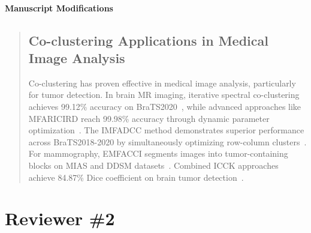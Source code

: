 \documentclass{ar2rc}
\theoremstyle{definition}
\theoremstyle{remark} %
\renewcommand{\cite}[1]{~\autocite{#1}}
\begin{document}

\paragraph{Manuscript Modifications}

\begin{quote}
  \subsection*{ Co-clustering Applications in Medical Image Analysis}
  Co-clustering has proven effective in medical image analysis, particularly for tumor detection. In brain MR imaging, iterative spectral co-clustering achieves 99.12\% accuracy on BraTS2020\cite{farnoosh2024DevelopmentUnsupervisedPseudodeep}, while advanced approaches like MFARICIRD reach 99.98\% accuracy through dynamic parameter optimization\cite{farnoosh2025PseudodeepUnsupervisedModelbased}. The IMFADCC method demonstrates superior performance across BraTS2018-2020 by simultaneously optimizing row-column clusters\cite{farnoosh2024BrainMagneticResonance}. For mammography, EMFACCI segments images into tumor-containing blocks on MIAS and DDSM datasets\cite{farnoosh2024NovelApproachAutomatic}. Combined ICCK approaches achieve 84.87\% Dice coefficient on brain tumor detection\cite{farnoosh2022ApplicationModifiedCombinational}.
\end{quote}


\section{Reviewer \#2}


\end{document}
